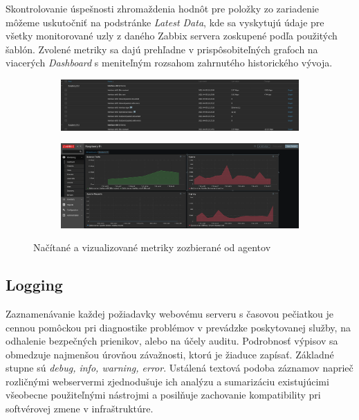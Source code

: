 \documentclass[12pt, a4paper]{article}
\begin{document}
Skontrolovanie úspešnosti zhromaždenia hodnôt pre položky zo zariadenie môžeme uskutočniť na 
podstránke \emph{Latest Data}, kde sa vyskytujú údaje pre všetky monitorované uzly
z daného Zabbix servera zoskupené podľa použitých šablón. Zvolené metriky sa dajú prehľadne v 
prispôsobiteľných grafoch na viacerých \emph{Dashboard} s meniteľným rozsahom zahrnutého
historického vývoja.
\begin{figure}[h]
	\centering
		\begin{subfigure}[t]{\textwidth}
  		\centering
  		\includegraphics[width=\textwidth]{images/zabbix-eth-rpi2.png}
	\end{subfigure}
	\vspace{1em}
	\begin{subfigure}[t]{\textwidth}
  		\centering
  		\includegraphics[width=\textwidth]{images/zabbix-dashboard.png}
	\end{subfigure}
	\caption{Načítané a vizualizované metriky zozbierané od agentov}
\end{figure}

\subsection{Logging}
Zaznamenávanie každej požiadavky webovému serveru s časovou pečiatkou je cennou pomôckou pri diagnostike 
problémov v prevádzke poskytovanej služby, na odhalenie bezpečných prienikov, alebo na účely auditu. 
Podrobnosť výpisov sa obmedzuje najmenšou úrovňou závažnosti, ktorú je žiaduce zapísať. Základné stupne
sú \emph{debug, info, warning, error}. Ustálená textová podoba záznamov naprieč rozličnými webservermi 
zjednodušuje ich analýzu a sumarizáciu existujúcimi všeobecne použiteľnými nástrojmi a posilňuje zachovanie 
kompatibility pri softvérovej zmene v infraštruktúre. 
\end{document}
